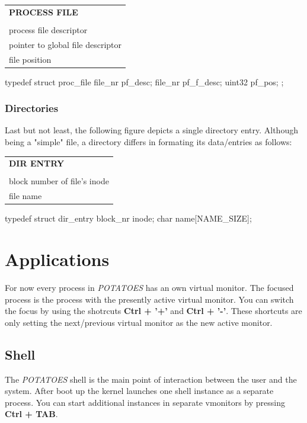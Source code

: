 \documentclass[11pt,a4paper]{scrartcl}
\begin{document}
\vspace{0.3cm}
\begin{tabular}{|l|}
\hline
\textbf{PROCESS FILE}\\\\\hline
process file descriptor\\\hline
pointer to global file descriptor\\\hline
file position\\\hline
\end{tabular}

\begin{code}
typedef struct proc_file {
		file_nr pf_desc;
		file_nr pf_f_desc;
		uint32 pf_pos;
};       
\end{code}
\subsubsection{Directories}
Last but not least, the following figure depicts a single directory entry. Although being a "simple" file, a directory differs in formating its data/entries as follows:

\vspace{0.3cm}
\begin{tabular}{|l|}
\hline
\textbf{DIR ENTRY}\\\\\hline
block number of file's inode\\\hline
file name\\\hline
\end{tabular}

\begin{code}
typedef struct dir_entry {
		block_nr inode;
		char name[NAME_SIZE];
}
\end{code}
\pagebreak
\section{Applications}

For now every process in \textit{POTATOES} has an own virtual monitor. The focused process is the process with the presently active virtual monitor. You can switch the focus by using the shotrcuts \textbf{Ctrl + '+'} and \textbf{Ctrl + '-'}. These shortcuts are only setting the next/previous virtual monitor as the new active monitor.

\subsection{Shell}
The \textit{POTATOES} shell is the main point of interaction between the user and the system. After boot up the kernel launches one shell instance as a separate process. You can start additional instances in separate vmonitors by pressing \textbf{Ctrl + TAB}.
\end{document}
